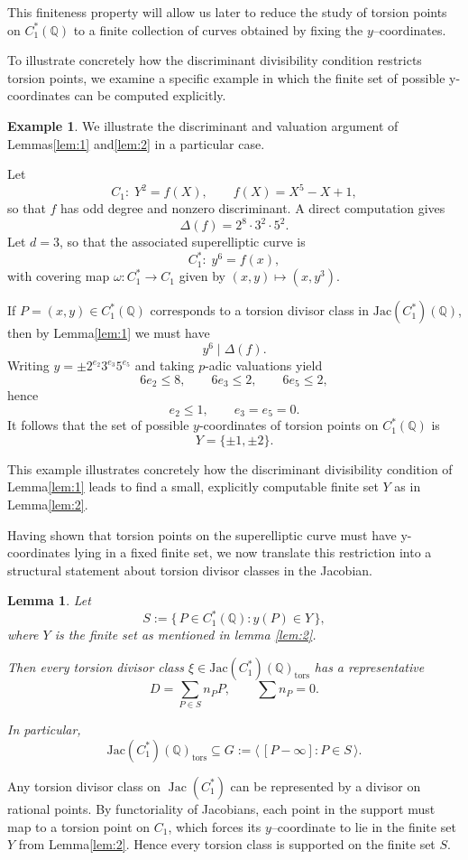 \documentclass[12pt, reqno]{amsart}
\newtheorem{lemma}[thm]{Lemma}
\numberwithin{equation}{section}
\theoremstyle{definition}
\newtheorem{example}[thm]{Example}
\theoremstyle{nodefstyle}
\newcommand{\Jac}{\operatorname{Jac}}
\begin{document}
This finiteness property will allow us later to reduce the study of torsion points on $C_1^*(\mathbb{Q})$ to a finite collection of curves obtained by fixing the $y$--coordinates.

To illustrate concretely how the discriminant divisibility condition restricts torsion points, we examine a specific example in which the finite set of possible 
y-coordinates can be computed explicitly.

\begin{example}
We illustrate the discriminant and valuation argument of Lemmas\autoref{lem:1} and\autoref{lem:2} in a particular case.

Let
\[
C_1:\; Y^2 = f(X), \qquad f(X)=X^5 - X + 1,
\]
so that \(f\) has odd degree and nonzero discriminant. A direct computation gives
\[
\Delta(f) = 2^8 \cdot 3^2 \cdot 5^2.
\]
Let \(d=3\), so that the associated superelliptic curve is
\[
C^{*}_1:\; y^6 = f(x),
\]
with covering map \(\omega : C^{*}_1 \to C_1\) given by \((x,y) \mapsto (x,y^3)\).

If \(P=(x,y)\in C^{*}_1(\mathbb{Q})\) corresponds to a torsion divisor class in
\(\mathrm{Jac}(C^{*}_1)(\mathbb{Q})\), then by Lemma\autoref{lem:1} we must have
\[
y^6 \mid \Delta(f).
\]
Writing \(y = \pm 2^{e_2} 3^{e_3} 5^{e_5}\) and taking \(p\)-adic valuations yield
\[
6e_2 \le 8, \qquad 6e_3 \le 2, \qquad 6e_5 \le 2,
\]
hence
\[
e_2 \le 1, \qquad e_3 = e_5 = 0.
\]
It follows that the set of possible \(y\)-coordinates of torsion points on
\(C^{*}_1(\mathbb{Q})\) is
\[
Y = \{\pm 1, \pm 2\}.
\]

This example illustrates concretely how the discriminant divisibility condition of
Lemma\autoref{lem:1} leads to find a small, explicitly computable finite set \(Y\) as in Lemma\autoref{lem:2}.
\end{example}

Having shown that torsion points on the superelliptic curve must have 
y-coordinates lying in a fixed finite set, we now translate this restriction into a structural statement about torsion divisor classes in the Jacobian.

\begin{lemma}\label{lem:3}
Let
\[
S := \{\,P\in C_1^*(\mathbb Q) : y(P)\in Y\,\},
\]
where \(Y\) is the finite set as mentioned in lemma \autoref{lem:2}.

Then every torsion divisor class \(\xi\in \mathrm{Jac}(C_1^*)(\mathbb Q)_{\mathrm{tors}}\) has a representative
\[
D = \sum_{P\in S} n_P P, \qquad \sum n_P = 0.
\]

In particular,
\[
\mathrm{Jac}(C_1^*)(\mathbb Q)_{\mathrm{tors}}
\subseteq
G := \langle\,[P-\infty] : P\in S\,\rangle.
\]
\end{lemma}
Any torsion divisor class on $\Jac(C_1^*)$ can be represented by a divisor on rational points. 
By functoriality of Jacobians, each point in the support must map to a torsion point on $C_1$, which forces its $y$--coordinate to lie in the finite set $Y$ from Lemma\autoref{lem:2}. 
Hence every torsion class is supported on the finite set $S$.
\end{document}
